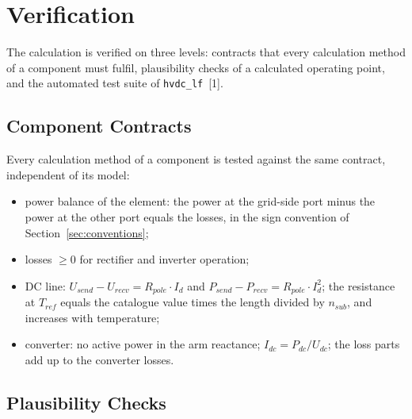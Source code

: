 \section{Verification}
\label{sec:verification}

The calculation is verified on three levels: contracts that every calculation method of a component must fulfil,
plausibility checks of a calculated operating point, and the automated test suite of \texttt{hvdc\_lf}~[1].

\subsection{Component Contracts}

Every calculation method of a component is tested against the same contract, independent of its model:
\begin{itemize}
  \item power balance of the element: the power at the grid-side port minus the power at the other port equals the
        losses, in the sign convention of Section~\ref{sec:conventions};
  \item losses $\geq 0$ for rectifier and inverter operation;
  \item DC line: $U_{send} - U_{recv} = R_{pole} \cdot I_d$ and $P_{send} - P_{recv} = R_{pole} \cdot I_d^2$; the
        resistance at $T_{ref}$ equals the catalogue value times the length divided by $n_{sub}$, and increases with
        temperature;
  \item converter: no active power in the arm reactance; $I_{dc} = P_{dc} / U_{dc}$; the loss parts add up to the
        converter losses.
\end{itemize}

\subsection{Plausibility Checks}

